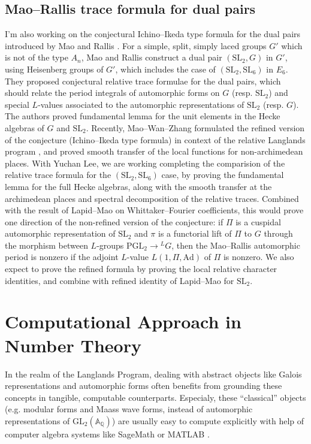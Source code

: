 \documentclass[12pt]{article}
\begin{document}
\subsection*{Mao--Rallis trace formula for dual pairs}

I'm also working on the conjectural Ichino--Ikeda type formula for the dual pairs introduced by Mao and Rallis \cite{mao1997trace}.
For a simple, split, simply laced groups $G'$ which is not of the type $A_n$, Mao and Rallis construct a dual pair $(\mathrm{SL}_{2}, G)$ in $G'$, using Heisenberg groups of $G'$, which includes the case of $(\mathrm{SL}_{2}, \mathrm{SL}_{6})$ in $E_6$.
They proposed conjectural relative trace formulae for the dual pairs, which should relate the period integrals of automorphic forms on $G$ (resp. $\mathrm{SL}_{2}$) and special $L$-values associated to the automorphic representations of $\mathrm{SL}_{2}$ (resp. $G$).
The authors proved fundamental lemma for the unit elements in the Hecke algebras of $G$ and $\mathrm{SL}_{2}$.
Recently, Mao--Wan--Zhang \cite{mao2023bzsv} formulated the refined version of the conjecture (Ichino--Ikeda type formula) in context of the relative Langlands program \cite{ben2023relative}, and proved smooth transfer of the local functions for non-archimedean places.
With Yuchan Lee, we are working completing the comparision of the relative trace formula for the $(\mathrm{SL}_{2}, \mathrm{SL}_{6})$ case, by proving the fundamental lemma for the full Hecke algebras, along with the smooth transfer at the archimedean places and spectral decomposition of the relative traces.
Combined with the result of Lapid--Mao \cite{lapid2015conjecture} on Whittaker--Fourier coefficients, this would prove one direction of the non-refined version of the conjecture: if $\Pi$ is a cuspidal automorphic representation of $\mathrm{SL}_{2}$ and $\pi$ is a functorial lift of $\Pi$ to $G$ through the morphism between $L$-groups $\mathrm{PGL}_{2} \to {}^L G$, then the Mao--Rallis automorphic period is nonzero if the adjoint $L$-value $L(1, \Pi, \mathrm{Ad})$ of $\Pi$ is nonzero.
We also expect to prove the refined formula by proving the local relative character identities, and combine with refined identity of Lapid--Mao for $\mathrm{SL}_{2}$.



\section*{Computational Approach in Number Theory}


In the realm of the Langlands Program, dealing with abstract objects like Galois representations and automorphic forms often benefits from grounding these concepts in tangible, computable counterparts.
Especialy, these ``classical'' objects (e.g. modular forms and Maass wave forms, instead of automorphic representations of $\mathrm{GL}_{2}(\mathbb{A}_{\mathbb{Q}})$) are usually easy to compute explicitly with help of computer algebra systems like SageMath \cite{sagemath} or MATLAB \cite{MATLAB}.
\end{document}
